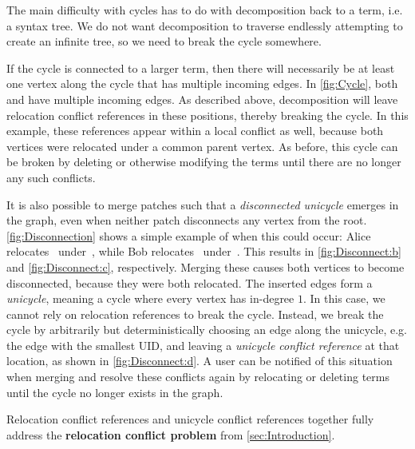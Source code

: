 The main difficulty with cycles has to do with decomposition back to a term, i.e. a syntax tree. We do not want decomposition to traverse endlessly attempting to create an infinite tree, so we need to break the cycle somewhere.

If the cycle is connected to a larger term, then there will necessarily be at least one vertex along the cycle that has multiple incoming edges. In \autoref{fig:Cycle}, both \vMultiCycleTimes{} and \vMultiCyclePlus{} have multiple incoming edges. As described above, decomposition will leave relocation conflict references in these positions, thereby breaking the cycle. In this example, these references appear within a local conflict as well, because both vertices were relocated under a common parent vertex. As before, this cycle can be broken by deleting or otherwise modifying the terms until there are no longer any such conflicts.

It is also possible to merge patches such that a \emph{disconnected unicycle} emerges in the graph, even when neither patch disconnects any vertex from the root. \autoref{fig:Disconnection} shows a simple example of when this could occur: Alice relocates~\vMultiCycleTimes{} under~\vSimpleTimes{},
while Bob relocates~\vSimpleTimes{} under~\vMultiCycleTimes{}. 
This results in \autoref{fig:Disconnect:b} and \autoref{fig:Disconnect:c}, respectively.
Merging these causes both vertices to become disconnected, because they were both relocated. The inserted edges form a \emph{unicycle}, meaning a cycle where every vertex has in-degree $1$. In this case, we cannot rely on relocation references to break the cycle. Instead, we break the cycle by arbitrarily but deterministically choosing an edge along the unicycle, e.g. the edge with the smallest UID, and leaving a \emph{unicycle conflict reference} at that location, as shown in \autoref{fig:Disconnect:d}. A user can be notified of this situation when merging and resolve these conflicts again by relocating or deleting terms until the cycle no longer exists in the graph.

Relocation conflict references and unicycle conflict references together fully address the \textbf{relocation conflict problem} from \autoref{sec:Introduction}.





